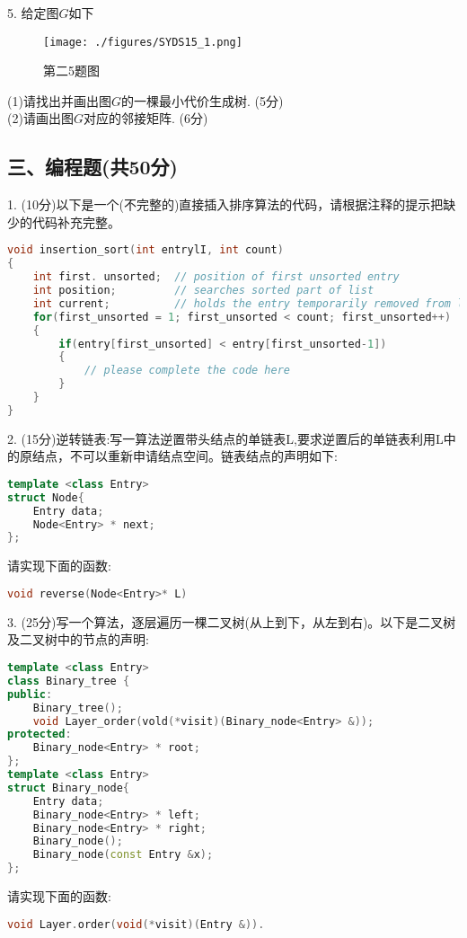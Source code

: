 5. 给定图$G$如下
\begin{figure}[ht]
\centering
\texttt{[image: ./figures/SYDS15\_1.png]}
\caption{第二5题图} \label{SYDS15_fig1}
\end{figure}
(1)请找出并画出图$G$的一棵最小代价生成树. (5分) \\
(2)请画出图$G$对应的邻接矩阵. (6分)

\subsection{三、编程题(共50分)}
1. (10分)以下是一个(不完整的)直接插入排序算法的代码，请根据注释的提示把缺少的代码补充完整。
\begin{lstlisting}[language=cpp]
void insertion_sort(int entrylI, int count)
{
    int first. unsorted;  // position of first unsorted entry
    int position;         // searches sorted part of list
    int current;          // holds the entry temporarily removed from list
    for(first_unsorted = 1; first_unsorted < count; first_unsorted++)
    {
        if(entry[first_unsorted] < entry[first_unsorted-1])
        {
            // please complete the code here
        }
    }
}
\end{lstlisting}

2. (15分)逆转链表:写一算法逆置带头结点的单链表L,要求逆置后的单链表利用L中的原结点，不可以重新申请结点空间。链表结点的声明如下:
\begin{lstlisting}[language=cpp]
template <class Entry>
struct Node{
    Entry data;
    Node<Entry> * next;
};
\end{lstlisting}
请实现下面的函数:
\begin{lstlisting}[language=cpp]
void reverse(Node<Entry>* L)
\end{lstlisting}

3. (25分)写一个算法，逐层遍历一棵二叉树(从上到下，从左到右)。以下是二叉树及二叉树中的节点的声明:
\begin{lstlisting}[language=cpp]
template <class Entry>
class Binary_tree {
public:
    Binary_tree();
    void Layer_order(vold(*visit)(Binary_node<Entry> &));
protected:
    Binary_node<Entry> * root;
};
template <class Entry>
struct Binary_node{
    Entry data;
    Binary_node<Entry> * left;
    Binary_node<Entry> * right;
    Binary_node();
    Binary_node(const Entry &x);
};
\end{lstlisting}
请实现下面的函数:
\begin{lstlisting}[language=cpp]
void Layer.order(void(*visit)(Entry &)).
\end{lstlisting}